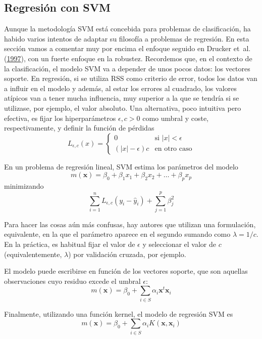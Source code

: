 \documentclass[
]{book}
\theoremstyle{break}
\theoremstyle{nonumberplain}
\begin{document}
\hypertarget{regresiuxf3n-con-svm}{%
\subsection{Regresión con SVM}\label{regresiuxf3n-con-svm}}

Aunque la metodología SVM está concebida para problemas de clasificación, ha habido varios intentos de adaptar su filosofía a problemas de regresión. En esta sección vamos a comentar muy por encima el enfoque seguido en Drucker et~al. (\protect\hyperlink{ref-drucker1997support}{1997}), con un fuerte enfoque en la robustez. Recordemos que, en el contexto de la clasificación, el modelo SVM va a depender de unos pocos datos: los vectores soporte. En regresión, si se utiliza RSS como criterio de error, todos los datos van a influir en el modelo y además, al estar los errores al cuadrado, los valores atípicos van a tener mucha influencia, muy superior a la que se tendría si se utilizase, por ejemplo, el valor absoluto. Una alternativa, poco intuitiva pero efectiva, es fijar los hiperparámetros \(\epsilon,c > 0\) como umbral y coste, respectivamente, y definir la función de pérdidas
\[
L_{\epsilon,c} (x) = \left\{ \begin{array}{ll}
  0 & \mbox{si } |x|< \epsilon \\
  (|x| - \epsilon)c & \mbox{en otro caso}
  \end{array}
  \right.
\]

En un problema de regresión lineal, SVM estima los parámetros del modelo
\[m(\mathbf{x}) = \beta_0 + \beta_1 x_1 + \beta_2 x_2 + \ldots + \beta_p x_p\]
minimizando
\[\sum_{i=1}^n L_{\epsilon,c} (y_i - \hat y_i) + \sum_{j=1}^p \beta_j^2\]

Para hacer las cosas aún más confusas, hay autores que utilizan una formulación, equivalente, en la que el parámetro aparece en el segundo sumando como \(\lambda = 1/c\). En la práctica, es habitual fijar el valor de \(\epsilon\) y seleccionar el valor de \(c\) (equivalentemente, \(\lambda\)) por validación cruzada, por ejemplo.

El modelo puede escribirse en función de los vectores soporte, que son aquellas observaciones cuyo residuo excede el umbral \(\epsilon\):
\[m(\mathbf{x}) = \beta_0 + \sum_{i\in S} \alpha_i \mathbf{x}^t \mathbf{x}_i\]

Finalmente, utilizando una función kernel, el modelo de regresión SVM es
\[m(\mathbf{x}) = \beta_0 + \sum_{i\in S} \alpha_i K(\mathbf{x}, \mathbf{x}_i)\]
\end{document}
